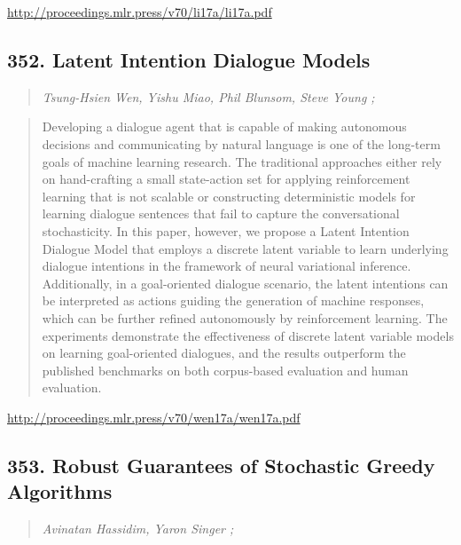 \documentclass{article}
\begin{document}
\href{http://proceedings.mlr.press/v70/li17a/li17a.pdf}{http://proceedings.mlr.press/v70/li17a/li17a.pdf}

\subsection{352. Latent Intention Dialogue Models}

\begin{quote}
\footnotesize{\textit{Tsung-Hsien Wen, Yishu Miao, Phil Blunsom, Steve Young ;}}
\end{quote}

\begin{quote}
    Developing a dialogue agent that is capable of making autonomous decisions and communicating by natural language is one of the long-term goals of machine learning research. The traditional approaches either rely on hand-crafting a small state-action set for applying reinforcement learning that is not scalable or constructing deterministic models for learning dialogue sentences that fail to capture the conversational stochasticity. In this paper, however, we propose a Latent Intention Dialogue Model that employs a discrete latent variable to learn underlying dialogue intentions in the framework of neural variational inference. Additionally, in a goal-oriented dialogue scenario, the latent intentions can be interpreted as actions guiding the generation of machine responses, which can be further refined autonomously by reinforcement learning. The experiments demonstrate the effectiveness of discrete latent variable models on learning goal-oriented dialogues, and the results outperform the published benchmarks on both corpus-based evaluation and human evaluation.  \end{quote}

\href{http://proceedings.mlr.press/v70/wen17a/wen17a.pdf}{http://proceedings.mlr.press/v70/wen17a/wen17a.pdf}

\subsection{353. Robust Guarantees of Stochastic Greedy Algorithms}

\begin{quote}
\footnotesize{\textit{Avinatan Hassidim, Yaron Singer ;}}
\end{quote}
\end{document}
